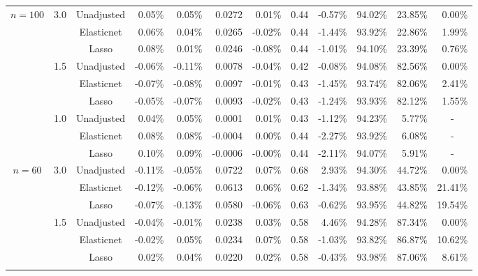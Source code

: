 \documentclass{article}
\begin{document}
\begin{center}
\begin{table}[!ht]
\begin{tabular*}{\textwidth}{@{\extracolsep\fill}c|c|c|rrrr|rrrrr}
         \multirow{9}{*}{$n = 100$} & \multirow{3}{*}{3.0} & Unadjusted & 0.05\% & 0.05\% & 0.0272 & 0.01\% & 0.44 & -0.57\% & 94.02\% & 23.85\% & 0.00\% \\ 
        ~ & ~ & Elasticnet & 0.06\% & 0.04\% & 0.0265 & -0.02\% & 0.44 & -1.44\% & 93.92\% & 22.86\% & 1.99\% \\ 
        ~ & ~ & Lasso & 0.08\% & 0.01\% & 0.0246 & -0.08\% & 0.44 & -1.01\% & 94.10\% & 23.39\% & 0.76\% \\      \cline{2-12}
        
        ~ & \multirow{3}{*}{1.5} & Unadjusted & -0.06\% & -0.11\% & 0.0078 & -0.04\% & 0.42 & -0.08\% & 94.08\% & 82.56\% & 0.00\% \\ 
        ~ & ~ & Elasticnet & -0.07\% & -0.08\% & 0.0097 & -0.01\% & 0.43 & -1.45\% & 93.74\% & 82.06\% & 2.41\% \\ 
        ~ & ~ & Lasso & -0.05\% & -0.07\% & 0.0093 & -0.02\% & 0.43 & -1.24\% & 93.93\% & 82.12\% & 1.55\% \\    \cline{2-12}
        
        ~ & \multirow{3}{*}{1.0} & Unadjusted & 0.04\% & 0.05\% & 0.0001 & 0.01\% & 0.43 & -1.12\% & 94.23\% & 5.77\% & \multicolumn{1}{c}{-} \\ 
        ~ & ~ & Elasticnet & 0.08\% & 0.08\% & -0.0004 & 0.00\% & 0.44 & -2.27\% & 93.92\% & 6.08\% & \multicolumn{1}{c}{-} \\ 
        ~ & ~ & Lasso & 0.10\% & 0.09\% & -0.0006 & -0.00\% & 0.44 & -2.11\% & 94.07\% & 5.91\% & \multicolumn{1}{c}{-} \\        \hline
        
        
        
         \multirow{9}{*}{$n = 60$} & \multirow{3}{*}{3.0} & Unadjusted & -0.11\% & -0.05\% & 0.0722 & 0.07\% & 0.68 & 2.93\% & 94.30\% & 44.72\% & 0.00\% \\ 
        ~ & ~ & Elasticnet & -0.12\% & -0.06\% & 0.0613 & 0.06\% & 0.62 & -1.34\% & 93.88\% & 43.85\% & 21.41\% \\ 
        ~ & ~ & Lasso & -0.07\% & -0.13\% & 0.0580 & -0.06\% & 0.63 & -0.62\% & 93.95\% & 44.82\% & 19.54\% \\      \cline{2-12}
        
        ~ & \multirow{3}{*}{1.5} & Unadjusted & -0.04\% & -0.01\% & 0.0238 & 0.03\% & 0.58 & 4.46\% & 94.28\% & 87.34\% & 0.00\% \\ 
        ~ & ~ & Elasticnet & -0.02\% & 0.05\% & 0.0234 & 0.07\% & 0.58 & -1.03\% & 93.82\% & 86.87\% & 10.62\% \\ 
        ~ & ~ & Lasso & 0.02\% & 0.04\% & 0.0220 & 0.02\% & 0.58 & -0.43\% & 93.98\% & 87.06\% & 8.61\% \\        \cline{2-12}
        

\end{tabular*}
\end{table}
\end{center}
\end{document}
